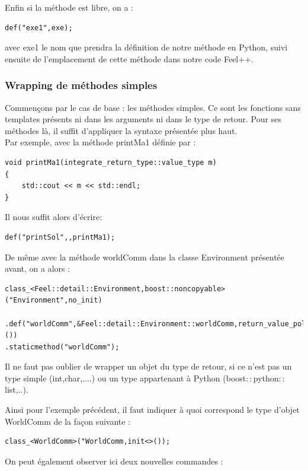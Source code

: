 \documentclass[french,12pt]{article}
\begin{document}
Enfin si la méthode est libre, on a : 
\begin{lstlisting}
def("exe1",exe);
\end{lstlisting}

avec exe1 le nom que prendra la définition de notre méthode en Python, suivi ensuite de l'emplacement de cette méthode dans notre code Feel++.
\newline

\subsubsection{Wrapping de méthodes simples}

Commençons par le cas de base : les méthodes simples. Ce sont les fonctions sans templates présents ni dans les arguments ni dans le type de retour.
Pour ses méthodes là, il suffit d'appliquer la syntaxe présentée plus haut.\\

Par exemple, avec la méthode printMa1 définie par :
\begin{lstlisting}
void printMa1(integrate_return_type::value_type m)
{
 	std::cout << m << std::endl;
}
\end{lstlisting}

Il nous suffit alors d'écrire:
\begin{lstlisting}
def("printSol",,printMa1);
\end{lstlisting}

De même avec la méthode worldComm dans la classe Environment présentée avant, on a alors :
\begin{lstlisting}
class_<Feel::detail::Environment,boost::noncopyable>("Environment",no_init)
	.def("worldComm",&Feel::detail::Environment::worldComm,return_value_policy<copy_non_const_reference>())
.staticmethod("worldComm");
\end{lstlisting}

Il ne faut pas oublier de wrapper un objet du type de retour, si ce n'est pas un type simple (int,char,....) ou un type appartenant à Python (boost$::$python$::$list,..).

Ainsi pour l'exemple précédent, il faut indiquer à quoi correspond le type d'objet WorldComm de la façon suivante :
\begin{lstlisting}
class_<WorldComm>("WorldComm,init<>());
\end{lstlisting} 

On peut également observer ici deux nouvelles commandes :\\
\end{document}
